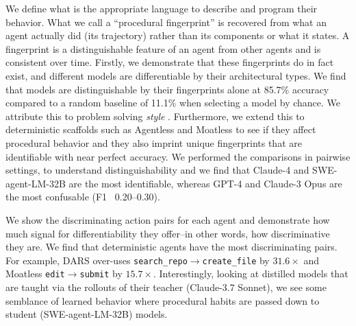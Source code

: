 \documentclass[11pt]{article}
\begin{document}
  We define what is the appropriate language to describe and program their behavior. What we call a ``procedural
  fingerprint'' is recovered from what an agent actually did (its trajectory) rather than its components or what it states.
  A fingerprint is a distinguishable feature of an agent from other agents and is consistent over time. Firstly, we
  demonstrate that these fingerprints do in fact exist, and different models are differentiable by their architectural
  types. We find that models are distinguishable by their fingerprints alone at 85.7\% accuracy compared to a random
  baseline of 11.1\% when selecting a model by chance. We attribute this to problem solving \emph{style}
  \citep{bisztray2025iknowllmwrote}. Furthermore, we extend this to deterministic scaffolds such as Agentless and Moatless
  to see if they affect procedural behavior and they also imprint unique fingerprints that are identifiable with near
  perfect accuracy. We performed the comparisons in pairwise settings, to understand distinguishability and we find that
  Claude-4 and SWE-agent-LM-32B are the most identifiable, whereas GPT-4 and Claude-3 Opus are the most confusable (F1
  ~0.20–0.30).


  We show the discriminating action pairs for each agent and demonstrate how much signal for differentiability they offer--in other words, how discriminative they are. We find that deterministic agents have the
  most discriminating pairs. For example, DARS over-uses
  \texttt{search\_repo}$\to$\texttt{create\_file} by $31.6\times$ and Moatless
  \texttt{edit}$\to$\texttt{submit} by $15.7\times$. Interestingly, looking at
  distilled models that are taught via the rollouts of their teacher
  (Claude-3.7 Sonnet), we see some semblance of learned behavior where procedural
  habits are passed down to student (SWE-agent-LM-32B) models.
\end{document}
